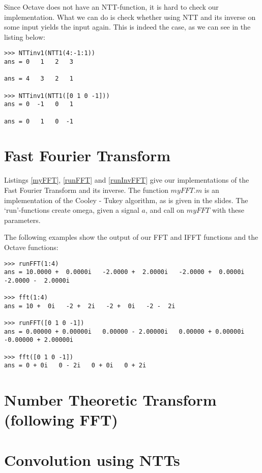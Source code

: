\documentclass{article}
\begin{document}
Since Octave does not have an NTT-function, it is hard to check our implementation. What we can do is check whether using NTT and its inverse on some input yields the input again. This is indeed the case, as we can see in the listing below:

\begin{lstlisting}
>>> NTTinv1(NTT1(4:-1:1))
ans = 0   1   2   3

ans = 4   3   2   1

>>> NTTinv1(NTT1([0 1 0 -1]))
ans = 0  -1   0   1

ans = 0   1   0  -1
\end{lstlisting}


 
 
 
 
\section{Fast Fourier Transform}
Listings \ref{myFFT}, \ref{runFFT} and \ref{runInvFFT} give our implementations of the Fast Fourier Transform and its inverse. The function $myFFT.m$ is an implementation of the Cooley - Tukey algorithm, as is given in the slides. The `run'-functions create omega, given a signal $a$, and call on $myFFT$ with these parameters. 

The following examples show the output of our FFT and IFFT functions and the Octave functions:

\begin{lstlisting}
>>> runFFT(1:4)
ans = 10.0000 +  0.0000i   -2.0000 +  2.0000i   -2.0000 +  0.0000i   -2.0000 -  2.0000i

>>> fft(1:4)
ans = 10 +  0i   -2 +  2i   -2 +  0i   -2 -  2i

>>> runFFT([0 1 0 -1])
ans = 0.00000 + 0.00000i   0.00000 - 2.00000i   0.00000 + 0.00000i   -0.00000 + 2.00000i

>>> fft([0 1 0 -1])
ans = 0 + 0i   0 - 2i   0 + 0i   0 + 2i
\end{lstlisting}

 
 
 

\section{Number Theoretic Transform (following FFT)}


\section{Convolution using NTTs}
 
\end{document}
